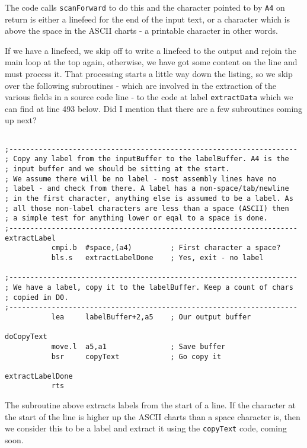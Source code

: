 The code calls \texttt{scanForward} to do this and the character pointed to by \texttt{A4} on return is either a linefeed for the end of the input text, or a character which is above the space in the ASCII charts - a printable character in other words.

If we have a linefeed, we skip off to write a linefeed to the output and rejoin the main loop at the top again, otherwise, we have got some content on the line and must process it. That processing starts a little way down the listing, so we skip over the following subroutines - which are involved in the extraction of the various fields in a source code line - to the code at label \texttt{extractData} which we can find at line 493 below. Did I mention that there are a few subroutines coming up next?

\begin{lstlisting}[firstnumber=last,caption={ASMReformat Source - Extracting Labels}]

;--------------------------------------------------------------------
; Copy any label from the inputBuffer to the labelBuffer. A4 is the
; input buffer and we should be sitting at the start.
; We assume there will be no label - most assembly lines have no
; label - and check from there. A label has a non-space/tab/newline
; in the first character, anything else is assumed to be a label. As
; all those non-label characters are less than a space (ASCII) then
; a simple test for anything lower or eqal to a space is done.
;--------------------------------------------------------------------
extractLabel
           cmpi.b  #space,(a4)         ; First character a space?
           bls.s   extractLabelDone    ; Yes, exit - no label

;--------------------------------------------------------------------
; We have a label, copy it to the labelBuffer. Keep a count of chars
; copied in D0.
;--------------------------------------------------------------------
           lea     labelBuffer+2,a5    ; Our output buffer

doCopyText
           move.l  a5,a1               ; Save buffer
           bsr     copyText            ; Go copy it

extractLabelDone
           rts
\end{lstlisting}

The subroutine above extracts labels from the start of a line. If the character at the start of the line is higher up the ASCII charts than a space character is, then we consider this to be a label and extract it using the \texttt{copyText} code, coming soon.

